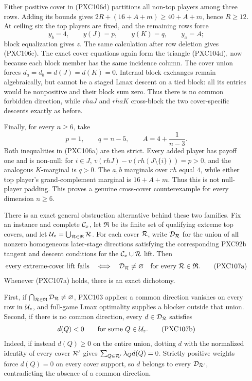 \documentclass[11pt]{article}
\begin{document}
Either positive cover in (PXC106d) partitions all non-top players among
three rows.  Adding its bounds gives
\(2R+(16+A+m)\ge40+A+m\), hence \(R\ge12\).  At ceiling six the top
players are fixed, and the remaining rows force
\[
 y_b=4,\qquad y(J)=p,\qquad y(K)=q,\qquad y_a=A;
\]
block equalization gives \(z\).  The same calculation after row deletion
gives (PXC106e).  The exact cover equations again form the triangle
(PXC104d), now because each block member has the same incidence column.
The cover union forces \(d_a=d_b=d(J)=d(K)=0\).  Internal block exchanges
remain algebraically, but cannot be a staged Lmax descent on a tied block:
all its entries would be nonpositive and their block sum zero.  Thus there
is no common forbidden direction, while \(rhaJ\) and \(rhaK\) cross-block
the two cover-specific descents exactly as before.

Finally, for every \(n\ge6\), take
\begin{equation}
 p=1,\qquad q=n-5,\qquad A=4+\frac{1}{n-3}.                \tag{PXC106f}
\end{equation}
Both inequalities in (PXC106a) are then strict.  Every added player has
payoff one and is non-null: for \(i\in J\),
\(v(rhJ)-v(rh(J\setminus\{i\}))=p>0\), and the analogous \(K\)-marginal
is \(q>0\).  The \(a,b\) marginals over \(rh\) equal \(4\), while either
top player's grand-complement marginal is \(16+A+m\).  Thus this is not
null-player padding.  This proves a genuine cross-cover counterexample for
every dimension \(n\ge6\).

There is an exact general obstruction alternative behind these two families.
Fix an instance and complete \({\cal C}_x\), let \(\mathfrak R\) be its
finite set of qualifying extreme top covers, and let
\({\cal U}_z=\bigcup_{{\cal R}\in\mathfrak R}{\cal R}\).  For each cover
\({\cal R}\), write \({\cal D}_{\cal R}\) for the union of all nonzero
homogeneous later-stage directions satisfying the corresponding PXC92b
tangent and descent conditions for the \({\cal C}_x\cup{\cal R}\) lift.
Then
\begin{equation}
 \text{every extreme-cover lift fails}
 \quad\Longleftrightarrow\quad
 {\cal D}_{\cal R}\ne\varnothing
 \quad\text{for every }{\cal R}\in\mathfrak R.               \tag{PXC107a}
\end{equation}
Whenever (PXC107a) holds, there is an exact dichotomy.

First, if
\(\bigcap_{{\cal R}\in\mathfrak R}{\cal D}_{\cal R}\ne\varnothing\),
PXC103 applies: a common direction vanishes on every row in
\({\cal U}_z\), and
full-game Lmax optimality supplies a blocker outside that union.  Second, if
there is no common direction, every \(d\in{\cal D}_{\cal R}\) satisfies
\begin{equation}
                 d(Q)<0\qquad\text{for some }Q\in{\cal U}_z. \tag{PXC107b}
\end{equation}
Indeed, if instead \(d(Q)\ge0\) on the entire union, dotting \(d\) with the
normalized identity of every cover \({\cal R}'\) gives
\(\sum_{Q\in{\cal R}'}\lambda_Qd(Q)=0\).  Strictly positive weights force
\(d(Q)=0\) on every cover support, so \(d\) belongs to every
\({\cal D}_{{\cal R}'}\), contradicting the absence of a common direction.
\end{document}
